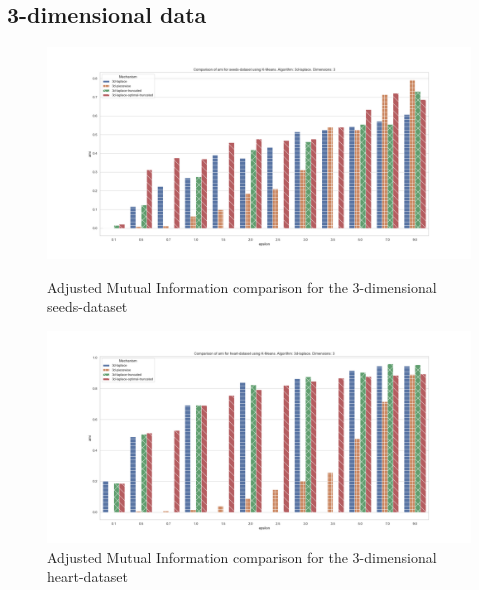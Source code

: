 \newpage
\subsection{3-dimensional data}
\begin{figure}[H]
    \centering
    \begin{minipage}[c]{0.8\textwidth}
        \includegraphics[width=1\textwidth]{Results/RQ2/seeds-dataset/ami_seeds-dataset_comparison.png}
        \caption{Adjusted Mutual Information comparison for the 3-dimensional seeds-dataset}
        \label{fig:ami_seeds-dataset_comparison_3d}
    \end{minipage}
    \begin{minipage}[c]{0.8\textwidth}
        \includegraphics[width=1\textwidth]{Results/RQ2/heart-dataset/ami_heart-dataset_comparison.png}
        \caption{Adjusted Mutual Information comparison for the 3-dimensional heart-dataset}
        \label{fig:ami_heart-dataset_comparison_3d}
    \end{minipage}

\end{figure}
\newpage
